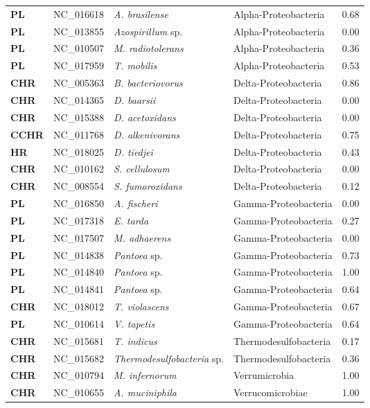 \begin{adjustwidth}{-3cm}{2cm}
{\begin{supertabular}{>{\bfseries}l|p{0.1\textwidth}p{0.14\textwidth}l|l}
PL & NC\_016618 & \textit{A. brasilense} & Alpha-Proteobacteria & 0.68\\
PL & NC\_013855 & \textit{Azospirillum }sp. & Alpha-Proteobacteria & 0.00\\
PL & NC\_010507 & \textit{M. radiotolerans} & Alpha-Proteobacteria & 0.36\\
PL & NC\_017959 & \textit{T. mobilis} & Alpha-Proteobacteria & 0.53\\
CHR & NC\_005363 & \textit{B. bacteriovorus} & Delta-Proteobacteria & 0.86\\
CHR & NC\_014365 & \textit{D. baarsii} & Delta-Proteobacteria & 0.00\\
CHR & NC\_015388 & \textit{D. acetoxidans} & Delta-Proteobacteria & 0.00\\
CCHR & NC\_011768 & \textit{D. alkenivorans} & Delta-Proteobacteria & 0.75\\
HR & NC\_018025 & \textit{D. tiedjei} & Delta-Proteobacteria & 0.43\\
CHR & NC\_010162 & \textit{S. cellulosum} & Delta-Proteobacteria & 0.00\\
CHR & NC\_008554 & \textit{S. fumaroxidans} & Delta-Proteobacteria & 0.12\\
PL & NC\_016850 & \textit{A. fischeri} & Gamma-Proteobacteria & 0.00\\
PL & NC\_017318 & \textit{E. tarda} & Gamma-Proteobacteria & 0.27\\
PL & NC\_017507 & \textit{M. adhaerens} & Gamma-Proteobacteria & 0.00\\
PL & NC\_014838 & \textit{Pantoea} sp. & Gamma-Proteobacteria & 0.73\\
PL & NC\_014840 & \textit{Pantoea} sp. & Gamma-Proteobacteria & 1.00\\
PL & NC\_014841 & \textit{Pantoea} sp. & Gamma-Proteobacteria & 0.64\\
CHR & NC\_018012 & \textit{T. violascens} & Gamma-Proteobacteria & 0.67\\
PL & NC\_010614 & \textit{V. tapetis} & Gamma-Proteobacteria & 0.64\\
CHR & NC\_015681 & \textit{T. indicus} & Thermodesulfobacteria & 0.17\\
CHR & NC\_015682 & \textit{Thermodesulfobacteria} sp. & Thermodesulfobacteria & 0.36\\
CHR & NC\_010794 & \textit{M. infernorum} & Verrumicrobia & 1.00\\
CHR & NC\_010655 & \textit{A. muciniphila} & Verrucomicrobiae & 1.00\\
\end{supertabular}
}
\endgroup
\addtolength{\textheight}{-5cm}

\addtolength{\voffset}{1cm}
\end{adjustwidth}

\onecolumn
